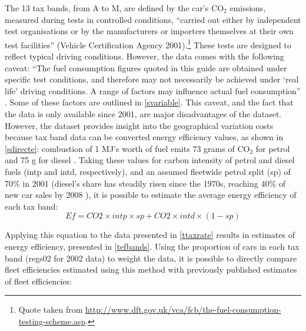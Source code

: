 The 13 tax bands, from A to M, are defined by the car's CO$_2$ emissions, measured
during tests in controlled conditions, ``carried out either by independent test
organisations or by the manufacturers or importers themselves at their own test
facilities'' (Vehicle Certification Agency 2001)⁠.\footnote{Quote taken from
\href{http://www.dft.gov.uk/vca/fcb/the-fuel-consumption-testing-scheme.asp}
{http://www.dft.gov.uk/vca/fcb/the-fuel-consumption-testing-scheme.asp}.
}
These tests are designed to reflect typical driving
conditions. However, the data comes with the following caveat: ``The fuel
consumption figures quoted in this guide are obtained under specific test
conditions, and therefore may not necessarily be achieved under `real life'
driving conditions. A range of factors may influence actual fuel consumption''
\citep{VehicleCertificationAgency2011}.
Some of these factors are outlined
in \cref{svariable}.
This caveat, and the fact that the data is only available since 2001, are major
disadvantages of the dataset. However, the dataset provides insight into
the geographical variation costs because tax band data can be
converted energy efficiency values, as shown in
\cref{sdirecte}: combustion of 1 MJ's worth of fuel emits
73
grams of CO$_2$ for petrol and 75 g for diesel \citep{Dimitriou2009}.
Taking these values for carbon intensity of petrol and diesel fuels
(intp and intd, respectively), and an assumed fleetwide petrol split (sp) of
70\% in 2001 (diesel's share has steadily risen since the 1970s, reaching 40\% of
new car sales by 2008 \citep{Bonilla2009}⁠), it is possible to estimate the average
energy efficiency of each tax band:
\begin{equation}
 Ef = CO2 \times intp \times sp + CO2 \times intd \times (1-sp)
 \label{ebands}
\end{equation}

Applying this equation to the data presented in \cref{ttaxrate} results in estimates of
energy efficiency, presented in \cref{tefbands}. Using the proportion of cars in each tax band
(regs02 for 2002 data) to weight the data, it is possible to directly compare
fleet efficiencies estimated using this method with previously published
estimates of fleet efficiencies:

